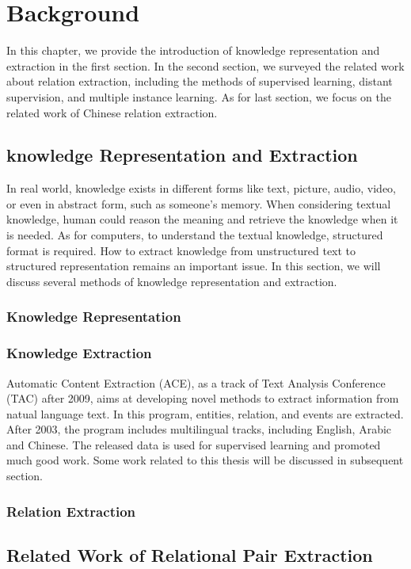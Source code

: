 \chapter{Background}
In this chapter, we provide the introduction of knowledge representation and extraction in the first section. 
In the second section, we surveyed the related work about relation extraction, including the methods of supervised learning, distant supervision, and multiple instance learning. 
As for last section, we focus on the related work of Chinese relation extraction.

\section{knowledge Representation and Extraction}
In real world, knowledge exists in different forms like text, picture, audio, video, or even in abstract form, such as someone’s memory. 
When considering textual knowledge, human could reason the meaning and retrieve the knowledge when it is needed. 
As for computers, to understand the textual knowledge, structured format is required. 
How to extract knowledge from unstructured text to structured representation remains an important issue. 
In this section, we will discuss several methods of knowledge representation and extraction.

\subsection{Knowledge Representation}

\subsection{Knowledge Extraction}
Automatic Content Extraction (ACE)\cite{ACE_intro}, as a track of Text Analysis Conference (TAC) after 2009, aims at developing novel methods to extract information from natual language text. 
In this program, entities, relation, and events are extracted.
After 2003, the program includes multilingual tracks, including English, Arabic and Chinese. 
The released data is used for supervised learning and promoted much good work. Some work related to this thesis will be discussed in subsequent section.

\subsection{Relation Extraction}

\section{Related Work of Relational Pair Extraction}

